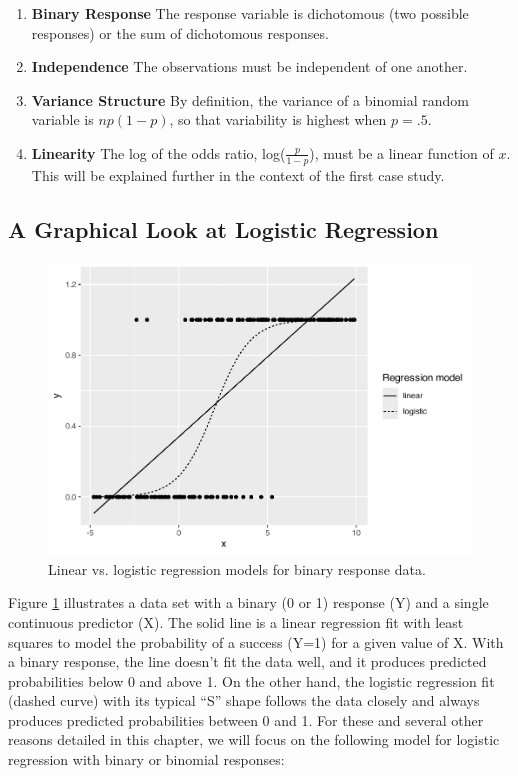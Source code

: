 \documentclass[
]{krantz}
\providecommand{\tightlist}{%
  \setlength{\itemsep}{0pt}\setlength{\parskip}{0pt}}
\begin{document}
\begin{enumerate}
\def\labelenumi{\arabic{enumi}.}
\tightlist
\item
  \textbf{Binary Response} The response variable is dichotomous (two possible responses) or the sum of dichotomous responses.
\item
  \textbf{Independence} The observations must be independent of one another.
\item
  \textbf{Variance Structure} By definition, the variance of a binomial random variable is \(np(1-p)\), so that variability is highest when \(p=.5\).
\item
  \textbf{Linearity} The log of the odds ratio, log(\(\frac{p}{1-p}\)), must be a linear function of \(x\). This will be explained further in the context of the first case study.
\end{enumerate}

\subsection{A Graphical Look at Logistic Regression}\label{a-graphical-look-at-logistic-regression}

\begin{figure}

{\centering \includegraphics[width=0.6\linewidth]{bookdown-BeyondMLR_files/figure-latex/OLSlogistic-1} 

}

\caption{Linear vs. logistic regression models for binary response data.}\label{fig:OLSlogistic}
\end{figure}

Figure \ref{fig:OLSlogistic} illustrates a data set with a binary (0 or 1) response (Y) and a single continuous predictor (X). The solid line is a linear regression fit with least squares to model the probability of a success (Y=1) for a given value of X. With a binary response, the line doesn't fit the data well, and it produces predicted probabilities below 0 and above 1. On the other hand, the logistic regression fit (dashed curve) with its typical ``S'' shape follows the data closely and always produces predicted probabilities between 0 and 1. For these and several other reasons detailed in this chapter, we will focus on the following model for logistic regression with binary or binomial responses:
\end{document}
